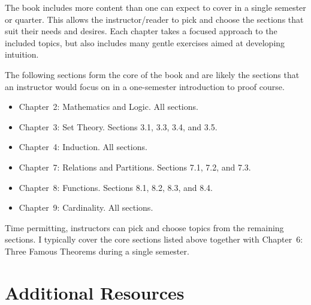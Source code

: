 \documentclass[11pt]{article}%
\newcommand{\blankline}{\pagebreak[2]\vspace{.5\baselineskip}}
\begin{document}
The book includes more content than one can expect to cover in a single semester or quarter. This allows the instructor/reader to pick and choose the sections that suit their needs and desires. Each chapter takes a focused approach to the included topics, but also includes many gentle exercises aimed at developing intuition.

\blankline

The following sections form the core of the book and are likely the sections that an instructor would focus on in a one-semester introduction to proof course.
\begin{itemize}
\item Chapter~2: Mathematics and Logic. All sections.
\item Chapter~3: Set Theory. Sections 3.1, 3.3, 3.4, and 3.5.
\item Chapter~4: Induction. All sections.
\item Chapter~7: Relations and Partitions. Sections 7.1, 7.2, and 7.3.
\item Chapter~8: Functions. Sections 8.1, 8.2, 8.3, and 8.4.
\item Chapter~9: Cardinality. All sections.
\end{itemize}
Time permitting, instructors can pick and choose topics from the remaining sections.  I typically cover the core sections listed above together with Chapter~6: Three Famous Theorems during a single semester. 

\section*{Additional Resources}
\end{document}

